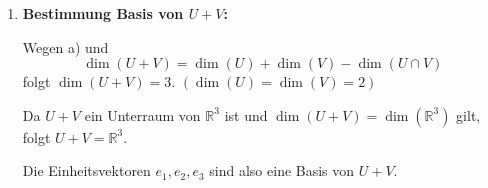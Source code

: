 \documentclass[a4paper,12pt]{article}
\begin{document}
\begin{enumerate}[label=\alph*)]
    Wegen $U \cap V = \left\{ \lambda \begin{pmatrix}4\\-4\\0\end{pmatrix} \;\middle|\; \forall\lambda \in \mathbb{R} \right\}$
    ist $\begin{pmatrix}4\\-4\\0\end{pmatrix}$ bzw.\ $\begin{pmatrix}1\\-1\\0\end{pmatrix}$ die Basis von $U \cap V$.

    \item \textbf{Bestimmung Basis von $U + V$:}

    Wegen a) und
    \[
        \dim(U + V) = \dim(U) + \dim(V) - \dim(U \cap V)
    \]
    folgt $\dim(U + V) = 3$. \quad $(\dim(U) = \dim(V) = 2)$

    Da $U + V$ ein Unterraum von $\mathbb{R}^3$ ist und
    $\dim(U + V) = \dim(\mathbb{R}^3)$ gilt, folgt $U + V = \mathbb{R}^3$.

    Die Einheitsvektoren $e_1, e_2, e_3$ sind also eine Basis von $U + V$.

\end{enumerate}
\end{document}
